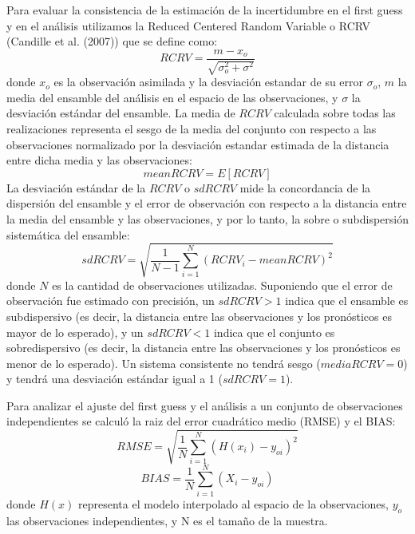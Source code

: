 \documentclass[12pt,oneside,a4paper]{reedthesis}
\begin{document}
Para evaluar la consistencia de la estimación de la incertidumbre en el first guess y en el análisis utilizamos la Reduced Centered Random Variable o RCRV (Candille et al. (2007)) que se define como:
\begin{equation}
\mathit{RCRV} = \frac{m - x_o}{\sqrt{\sigma_o^2 + \sigma^2}}
\label{eq:eq6}
\end{equation}
donde \(x_o\) es la observación asimilada y la desviación estandar de su error \(\sigma_o\), \(m\) la media del ensamble del análisis en el espacio de las observaciones, y \(\sigma\) la desviación estándar del ensamble.
La media de \(RCRV\) calculada sobre todas las realizaciones representa el sesgo de la media del conjunto con respecto a las observaciones normalizado por la desviación estandar estimada de la distancia entre dicha media y las observaciones:
\begin{equation}
\mathit{mean RCRV} = E[RCRV]
\label{eq:eq7}
\end{equation}
La desviación estándar de la \(RCRV\) o \(sd RCRV\) mide la concordancia de la dispersión del ensamble y el error de observación con respecto a la distancia entre la media del ensamble y las observaciones, y por lo tanto, la sobre o subdispersión sistemática del ensamble:
\begin{equation}
\mathit{sd RCRV} = \sqrt{\frac{1}{N -1}\sum_{i=1}^{N}(RCRV_i - \mathit{mean RCRV})^2}
\label{eq:eq8}
\end{equation}
donde \(N\) es la cantidad de observaciones utilizadas. Suponiendo que el error de observación fue estimado con precisión, un \(sd RCRV > 1\) indica que el ensamble es subdispersivo (es decir, la distancia entre las observaciones y los pronósticos es mayor de lo esperado), y un \(sd RCRV < 1\) indica que el conjunto es sobredispersivo (es decir, la distancia entre las observaciones y los pronósticos es menor de lo esperado). Un sistema consistente no tendrá sesgo (\(media RCRV = 0\)) y tendrá una desviación estándar igual a 1 (\(sd RCRV = 1\)).

Para analizar el ajuste del first guess y el análisis a un conjunto de observaciones independientes se calculó la raiz del error cuadrático medio (RMSE) y el BIAS:
\begin{equation}
\mathit{RMSE} = \sqrt{\frac{1}{N}\sum_{i = 1}^{N} (H(x_i) - y_{oi})^{2}}
\label{eq:eq9}
\end{equation}
\begin{equation}
\mathit{BIAS} = \frac{1}{N}\sum_{i = 1}^{N} (X_i - y_{oi})
\label{eq:eq10}
\end{equation}
donde \(H(x)\) representa el modelo interpolado al espacio de la observaciones, \(y_{o}\) las observaciones independientes, y N es el tamaño de la muestra.
\end{document}
